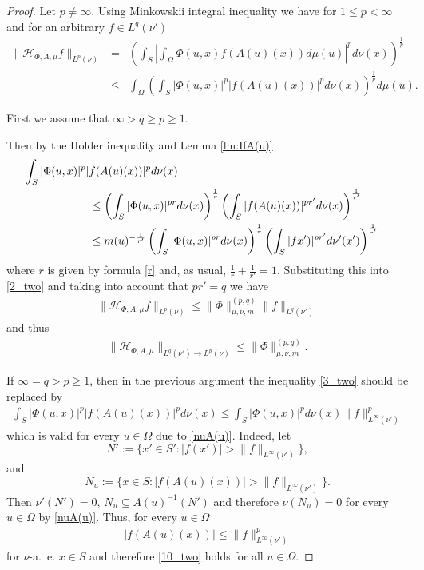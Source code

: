 \documentclass[12pt,reqno]{amsart}
\begin{document}
\begin{proof}
Let $p\ne \infty$. Using Minkowskii integral
inequality  we have for $1\le p<\infty$ and for an arbitrary $f\in L^q(\nu')$
\begin{eqnarray}\label{2_two}
\|\mathcal{H}_{\Phi, A,\mu}f\|_{L^p(\nu)}&=&\left(\int_{S} \left|\int_\Omega \Phi(u,x)f(A(u)(x))d\mu(u) \right|^pd\nu(x)\right)^{\frac 1p}\\ \nonumber
&\leq&
\int_\Omega\left(\int_{S}|\Phi(u,x)|^p|f(A(u)(x))|^pd\nu(x)\right)^{\frac 1p}d\mu(u).
\end{eqnarray}

First we assume that  $\infty>q\ge p\ge 1$.

Then by the Holder inequality and Lemma \ref{lm:IfA(u)}
\begin{align}\label{3_two}
\int_{S}|\Phi(u,x)|^p|f(A(u)(x))|^pd\nu(x)\\  \nonumber
&\hspace{-28mm}\le\left(\int_{S}|\Phi(u,x)|^{pr}d\nu(x)\right)^{\frac 1r} \left(\int_{S}|f(A(u)(x))|^{pr'}d\nu(x)\right)^{\frac 1{r'}}\\  \nonumber
&\hspace{-28mm}\le m(u)^{-\frac 1{r'}}\left(\int_{S}|\Phi(u,x)|^{pr}d\nu(x)\right)^{\frac 1r}
\left(\int_{S}|fx')|^{pr'}d\nu'(x')\right)^{\frac 1{r'}}
\end{align}
where $r$ is given by formula \eqref{r} and, as usual, $\frac 1r+\frac 1{r'}=1$.  Substituting this into \eqref{2_two} and taking into account that $pr'=q$ we have
\begin{eqnarray*}
\|\mathcal{H}_{\Phi, A,\mu}f\|_{L^p(\nu)}
\leq  \|\Phi\|_{\mu,\nu,m}^{(p,q)}\|f\|_{L^q(\nu')}
\end{eqnarray*}
and thus
\begin{eqnarray}\label{4_two}
\|\mathcal{H}_{\Phi, A,\mu}\|_{L^q(\nu')\to L^p(\nu)}
\leq  \|\Phi\|_{\mu,\nu,m}^{(p,q)}.
\end{eqnarray}

If $\infty=q> p\ge 1$, then in the previous argument the inequality \eqref{3_two} should be replaced by
\begin{align}\label{10_two}
\int_{S}|\Phi(u,x)|^p|f(A(u)(x))|^pd\nu(x)
\le\int_{S}|\Phi(u,x)|^{p}d\nu(x)\|f\|_{L^\infty(\nu')}^p
\end{align}
which is valid for every $u\in \Omega$ due to \eqref{nuA(u)}. Indeed, let 
$$
N':=\{x'\in S': |f(x')|>\|f\|_{L^\infty(\nu')}\},
$$
and
$$
N_u:=\{x\in S: |f(A(u)(x))|>\|f\|_{L^\infty(\nu')}\}.
$$
Then $\nu'(N')=0$, $N_u\subseteq A(u)^{-1}(N')$ and  therefore $\nu(N_u)=0$ for every $u\in \Omega$ by \eqref{nuA(u)}.
Thus, for every $u\in \Omega$ 
\begin{align}\label{20_two}
 |f(A(u)(x))|\le \|f\|_{L^\infty(\nu')}^p
 \end{align}
  for $\nu$-a.~e. $x\in S$
and therefore \eqref{10_two} holds for all $u\in \Omega$.


\end{proof}
\end{document}
